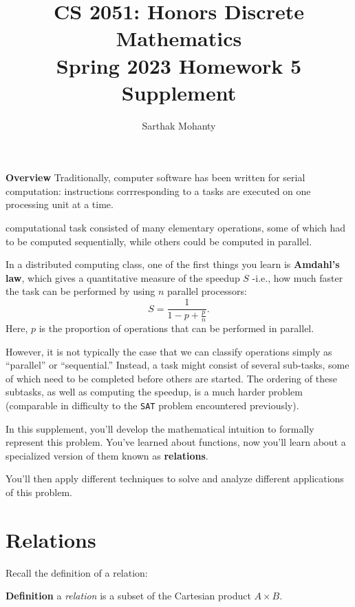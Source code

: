 \documentclass{article}
\title{\vspace{-1cm}CS 2051: Honors Discrete Mathematics \\Spring 2023 Homework 5 Supplement}
\author{Sarthak Mohanty }
\date{}
\begin{document}
\maketitle


\textbf{Overview}
    Traditionally, computer software has been written for serial computation: instructions corrresponding to a tasks are executed on one processing unit at a time.



  computational task consisted of many elementary operations, some of which had to be computed sequentially, while others could be computed in parallel. 

  In a distributed computing class, one of the first things you learn is \textbf{Amdahl’s law}, which gives a quantitative measure of the speedup $S$ -i.e., how much faster the task can be performed by using $n$ parallel processors:
  $$S = \frac{1}{1 - p + \frac{p}{n}}.$$ Here, $p$ is the proportion of operations that can be performed in parallel.

    \vspace{2mm}
    However, it is not typically the case that we can classify operations simply as “parallel” or “sequential.” Instead, a task might consist of several sub-tasks, some of which need to be completed before others are started. The ordering of these subtasks, as well as computing the speedup, is a much harder problem (comparable in difficulty to the \verb+SAT+ problem encountered previously).

    \vspace{2mm}
    In this supplement, you'll develop the mathematical intuition to formally represent this problem. You've learned about functions, now you'll learn about a specialized version of them known as \textbf{relations}.
    
    
    You'll then apply different techniques to solve and analyze different applications of this problem.





\section*{Relations}

    Recall the definition of a relation:
    
    \vspace{1.5mm}
    \textbf{Definition} a \textit{relation} is a subset of the Cartesian product $A\times B$.
    
\end{document}
